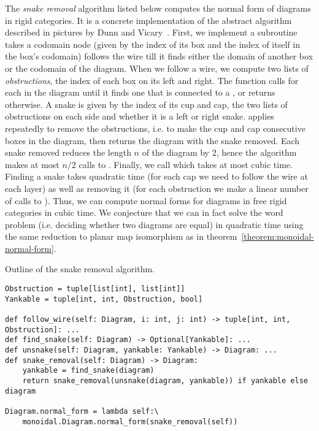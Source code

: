 The \emph{snake removal} algorithm listed below computes the normal form of diagrams in rigid categories.
It is a concrete implementation of the abstract algorithm described in pictures by Dunn and Vicary~\cite[2.12]{DunnVicary19}.
First, we implement a subroutine  takes a codomain node (given by the index  of its box and the index  of itself in the box's codomain)
follows the wire till it finds either the domain of another box or the codomain of the diagram.
When we follow a wire, we compute two lists of \emph{obstructions}, the index of each box on its left and right.
The  function calls  for each  in the diagram until it finds one that is connected to a , or returns  otherwise.
A  snake is given by the index of its cup and cap, the two lists of obstructions on each side and whether it is a left or right snake.
 applies  repeatedly to remove the obstructions, i.e. to make the cup and cap consecutive boxes in the diagram, then returns the diagram with the snake removed.
Each snake removed reduces the length $n$ of the diagram by 2, hence the  algorithm makes at most $n / 2$ calls to .
Finally, we call  which takes at most cubic time.
Finding a snake takes quadratic time (for each cap we need to follow the wire at each layer) as well as removing it (for each obstruction we make a linear number of calls to ).
Thus, we can compute normal forms for diagrams in free rigid categories in cubic time.
We conjecture that we can in fact solve the word problem (i.e. deciding whether two diagrams are equal) in quadratic time using the same reduction to planar map isomorphism as in theorem~\ref{theorem:monoidal-normal-form}.

\begin{python}\label{listing:snake-removal}
{\normalfont Outline of the snake removal algorithm.}

\begin{verbatim}
Obstruction = tuple[list[int], list[int]]
Yankable = tuple[int, int, Obstruction, bool]

def follow_wire(self: Diagram, i: int, j: int) -> tuple[int, int, Obstruction]: ...
def find_snake(self: Diagram) -> Optional[Yankable]: ...
def unsnake(self: Diagram, yankable: Yankable) -> Diagram: ...
def snake_removal(self: Diagram) -> Diagram:
    yankable = find_snake(diagram)
    return snake_removal(unsnake(diagram, yankable)) if yankable else diagram

Diagram.normal_form = lambda self:\
    monoidal.Diagram.normal_form(snake_removal(self))
\end{verbatim}
\end{python}

